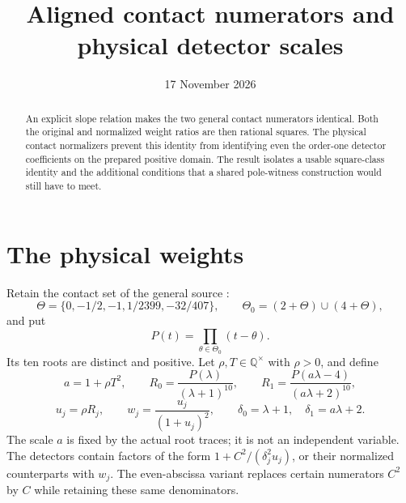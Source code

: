 \documentclass[10pt,a4paper]{article}
\title{Aligned contact numerators and physical detector scales}
\author{}\date{17 November 2026}
\newcommand{\Q}{\mathbb Q}
\begin{document}
\maketitle

\begin{abstract}
An explicit slope relation makes the two general contact numerators
identical. Both the original and normalized weight ratios are then
rational squares. The physical contact normalizers prevent this
identity from identifying even the order-one detector coefficients
on the prepared positive domain. The result isolates a usable
square-class identity and the additional conditions that a shared
pole-witness construction would still have to meet.
\end{abstract}

\section*{The physical weights}
Retain the contact set of the general source \cite{Reweighted}:
\[
 \Theta=\{0,-1/2,-1,1/2399,-32/407\},\qquad
 \Theta_0=(2+\Theta)\cup(4+\Theta),
\]
and put
\[
 P(t)=\prod_{\theta\in\Theta_0}(t-\theta).
\]
Its ten roots are distinct and positive. Let $\rho,T\in\Q^\times$
with $\rho>0$, and define
\[
 a=1+\rho T^2,\qquad
 R_0=\frac{P(\lambda)}{(\lambda+1)^{10}},\qquad
 R_1=\frac{P(a\lambda-4)}{(a\lambda+2)^{10}},
\]
\[
 u_j=\rho R_j,\qquad
 w_j=\frac{u_j}{(1+u_j)^2},\qquad
 \delta_0=\lambda+1,\quad \delta_1=a\lambda+2.
\]
The scale $a$ is fixed by the actual root traces; it is not an
independent variable. The detectors contain factors of the form
$1+C^2/(\delta_j^2u_j)$, or their normalized counterparts with
$w_j$. The even-abscissa variant \cite{Even} replaces certain
numerators $C^2$ by $C$ while retaining these same denominators.
\end{document}
